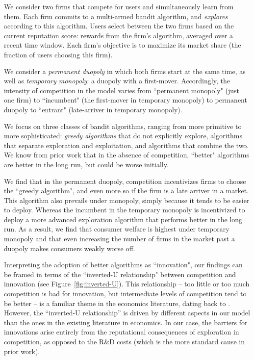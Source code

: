 \documentclass[../competing_bandits_with_appendix.tex]{subfiles}
\begin{document}
 We consider two firms that compete for users and simultaneously learn from them. Each firm commits to a multi-armed bandit algorithm, and \emph{explores} according to this algorithm. Users select between the two firms based on the current reputation score: rewards from the firm's algorithm, averaged over a recent time window. Each firm's objective is to maximize its market share (the fraction of users choosing this firm).



We consider a \emph{permanent duopoly} in which both firms start at the same time, as well as \emph{temporary monopoly}: a duopoly with a first-mover. Accordingly, the intensity of competition in the model varies from ``permanent monopoly" (just one firm) to ``incumbent" (the first-mover in temporary monopoly) to permanent duopoly to ``entrant" (late-arriver in temporary monopoly).

We focus on three classes of bandit algorithms, ranging from more primitive to more sophisticated: \emph{greedy algorithms} that do not explicitly explore, algorithms that separate exploration and exploitation, and algorithms that combine the two. We know from prior work that in the absence of competition,  ``better" algorithms are better in the long run, but could be worse initially.


We find that in the permanent duopoly, competition incentivizes firms to choose the ``greedy algorithm", and even more so if the firm is a late arriver in a market. This algorithm also prevails under monopoly, simply because it tends to be easier to deploy. Whereas the incumbent in the temporary monopoly is incentivized to deploy a more advanced exploration algorithm that performs better in the long run. As a result, we find that consumer welfare is highest under temporary monopoly and that even increasing the number of firms in the market past a duopoly makes consumers weakly worse off.

Interpreting the adoption of better algorithms as ``innovation", our findings can be framed in terms of the ``inverted-U relationship" between competition and innovation (see Figure~\ref{fig:inverted-U}). This relationship -- too little or too much competition is bad for innovation, but intermediate levels of competition tend to be better -- is a familiar theme in the economics literature, dating back to \cite{Schumpeter-42}. However, the ``inverted-U relationship'' is driven by different aspects in our model than the ones in the existing literature in economics. In our case, the barriers for innovations arise entirely from the reputational consequences of exploration in competition, as opposed to the R\&D costs (which is the more standard cause in prior work).
\end{document}
